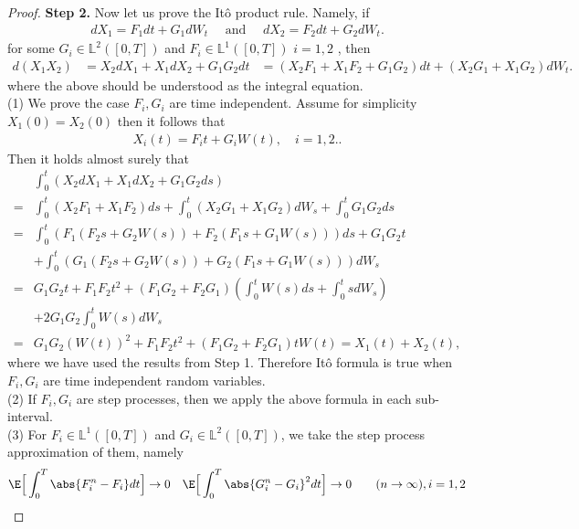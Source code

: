 \begin{proof}
  \vskip3mm
  \textbf{Step 2.} Now let us prove the It\^o product rule. Namely, if 
  \begin{align*}
    dX_{1} = F_{1}dt + G_{1}dW_t \quad \text{ and } \quad dX_{2} = F_{2}dt+G_{2}dW_t
  .\end{align*}
  for some $G_i \in  \mathbb{L}^2([0,T])$ and $F_i \in  \mathbb{L}^1([0,T])$ $i=1,2$ , then 
  \begin{align*}
    d(X_{1}X_{2}) &= X_{2}dX_{1} + X_{1}dX_{2} + G_{1}G_{2} dt
                  &=(X_{2}F_{1}+X_{1}F_{2}+G_{1}G_{2})dt + (X_{2}G_{1}+X_{1}G_{2})dW_t
  .\end{align*}
  where the above should be understood as the integral equation.\\
 \vskip2mm  (1) We prove the case $F_i,G_i$ are time independent. Assume for simplicity $X_{1}(0) = X_{2}(0)$ then it follows that 
  \begin{align*}
    X_i(t) = F_it +G_iW(t), \quad i=1,2.
  .\end{align*}
  Then it holds almost surely that 
  \begin{align*}
    &\int_0^{t} (X_{2}dX_{1} + X_{1}dX_{2} + G_{1}G_{2} ds) \\
    =& \int_0^{t} (X_{2}F_{1}+X_{1}F_{2}) ds + \int_0^{t} (X_{2}G_{1}+X_{1}G_{2}) dW_s + \int_0^{t} G_{1}G_{2}ds   \\
    =& \int_0^{t} \left( F_{1}(F_{2}s + G_{2}W(s))  + F_{2}(F_{1}s+G_{1}W(s))\right) ds + G_{1}G_{2}t\\
    &+ \int_0^{t} \left( G_{1}(F_{2}s + G_{2}W(s)) + G_{2}(F_{1}s+G_{1}W(s)) \right) dW_s \\
    =& G_{1}G_{2}t + F_{1}F_{2}t^2+(F_{1}G_{2}+F_{2}G_{1})\left( \int_0^{t}W(s) ds + \int_0^{t} s dW_s   \right) \\
    & + 2G_{1}G_{2} \int_0^{t} W(s) dW_s\\ 
=&  G_{1}G_{2}(W(t))^2  + F_{1}F_{2}t^2 + (F_{1}G_{2}+F_{2}G_{1})tW(t) = X_{1}(t)+X_{2}(t)
  ,\end{align*}
   where we have used the results from Step 1. Therefore It\^o formula is true when $F_i,G_i$ are time independent random variables.\\
  \vskip2mm
  (2) If $F_i,G_i$ are step processes, then we apply the above formula in each sub-interval.\\
  \vskip2mm
  (3) For $F_i \in  \mathbb{L}^1([0,T])$ and $G_i \in  \mathbb{L}^2([0,T])$, we take the step process approximation of them, namely
  \begin{align*}
    \E\Big[\int_0^{T} \abs{F_i^{n} - F_i } dt \Big] \to 0 \quad \E\Big[\int_0^{T} \abs{G_i^{n} - G_i }^2 dt \Big] \to 0 \qquad (n\to \infty), i=1,2

\end{align*}
\end{proof}
